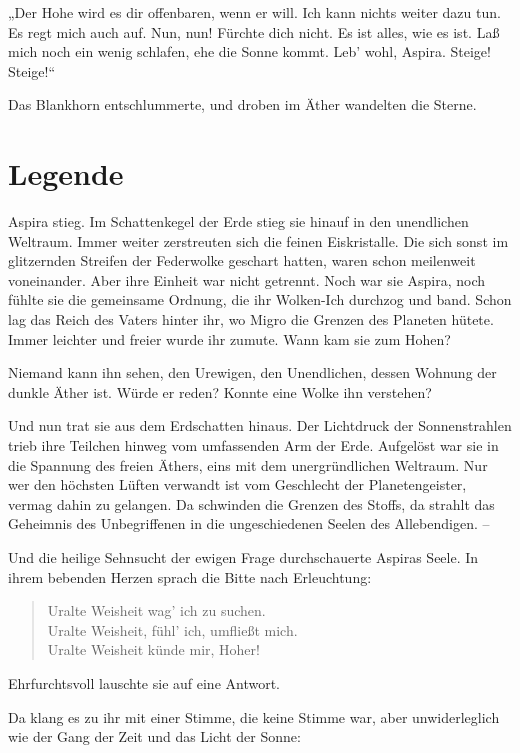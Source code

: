 „Der Hohe wird es dir offenbaren, wenn er will. Ich kann nichts
weiter dazu tun. Es regt mich auch auf. Nun, nun! Fürchte dich
nicht. Es ist alles, wie es ist. Laß mich noch ein wenig schlafen,
ehe die Sonne kommt. Leb' wohl, Aspira. Steige! Steige!“

Das Blankhorn entschlummerte, und droben im Äther wandelten die
Sterne.

\section{Legende}

Aspira stieg. Im Schattenkegel der Erde stieg sie hinauf in den
unendlichen Weltraum. Immer weiter zerstreuten sich die feinen
Eiskristalle. Die sich sonst im glitzernden Streifen der Federwolke
geschart hatten, waren schon meilenweit voneinander. Aber ihre
Einheit war nicht getrennt. Noch war sie Aspira, noch fühlte sie
die gemeinsame Ordnung, die ihr Wolken-Ich durchzog und band. Schon
lag das Reich des Vaters hinter ihr, wo Migro die Grenzen des
Planeten hütete. Immer leichter und freier wurde ihr zumute. Wann
kam sie zum Hohen?

Niemand kann ihn sehen, den Urewigen, den Unendlichen, dessen
Wohnung der dunkle Äther ist. Würde er reden? Konnte eine Wolke ihn
verstehen?

Und nun trat sie aus dem Erdschatten hinaus. Der Lichtdruck der
Sonnenstrahlen trieb ihre Teilchen hinweg vom umfassenden Arm der
Erde. Aufgelöst war sie in die Spannung des freien Äthers, eins mit
dem unergründlichen Weltraum. Nur wer den höchsten Lüften verwandt
ist vom Geschlecht der Planetengeister, vermag dahin zu gelangen.
Da schwinden die Grenzen des Stoffs, da strahlt das Geheimnis des
Unbegriffenen in die ungeschiedenen Seelen des Allebendigen. –

Und die heilige Sehnsucht der ewigen Frage durchschauerte Aspiras
Seele. In ihrem bebenden Herzen sprach die Bitte nach Erleuchtung:

\begin{verse}
Uralte Weisheit wag' ich zu suchen.\\ Uralte Weisheit, fühl' ich,
umfließt mich.\\ Uralte Weisheit künde mir, Hoher!
\end{verse}
Ehrfurchtsvoll lauschte sie auf eine Antwort.

Da klang es zu ihr mit einer Stimme, die keine Stimme war, aber
unwiderleglich wie der Gang der Zeit und das Licht der Sonne:

